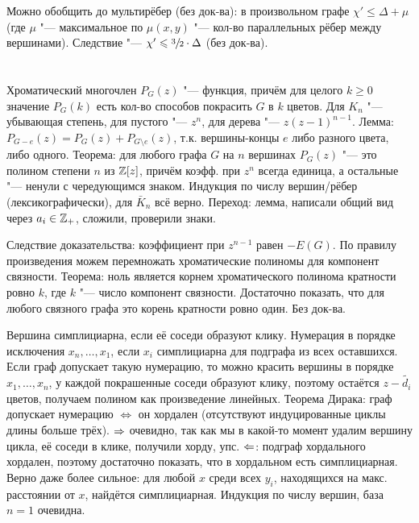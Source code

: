 	Можно обобщить до мультирёбер (без док-ва): в произвольном графе $\chi' \le \Delta + \mu$ (где $\mu$ "--- максимальное по $\mu(x, y)$ "--- кол-во параллельных рёбер между вершинами).
	Следствие "--- $\chi' \leqslant \sfrac 32 \cdot \Delta$ (без док-ва).

\section{} %
	Хроматический многочлен $P_G(z)$ "--- функция, причём для целого $k \ge 0$ значение $P_G(k)$ есть
	кол-во способов покрасить $G$ в $k$ цветов.
	Для $K_n$ "--- убывающая степень, для пустого "--- $z^n$, для дерева "--- $z(z-1)^{n-1}$.
	Лемма: $P_{G-e}(z) = P_G(z) + P_{G \setminus e}(z)$, т.к. вершины-концы $e$ либо разного цвета, либо одного.
	Теорема: для любого графа $G$ на $n$ вершинах $P_G(z)$ "--- это полином степени $n$ из $\mathbb{Z}[z]$,
	причём коэфф. при $z^n$ всегда единица, а остальные "--- ненули с чередующимся знаком.
	Индукция по числу вершин/рёбер (лексикографически), для $\bar K_n$ всё верно.
	Переход: лемма, написали общий вид через $a_i \in \mathbb{Z}_{+}$, сложили, проверили знаки.

	Следствие доказательства: коэффициент при $z^{n-1}$ равен $-E(G)$.
	По правилу произведения можем перемножать хроматические полиномы для компонент связности.
	Теорема: ноль является корнем хроматического полинома кратности ровно $k$, где $k$ "--- число компонент связности.
	Достаточно показать, что для любого связного графа это корень кратности ровно один.
	Без док-ва.

	Вершина симплициарна, если её соседи образуют клику.
	Нумерация в порядке исключения $x_n, \dots, x_1$, если $x_i$ симплициарна для подграфа из всех оставшихся.
	Если граф допускает такую нумерацию, то можно красить вершины в порядке $x_1, \dots, x_n$, у каждой покрашенные
	соседи образуют клику, поэтому остаётся $z - \tilde{d_i}$ цветов, получаем полином как произведение линейных.
	Теорема Дирака: граф допускает нумерацию $\iff$ он хордален (отсутствуют индуцированные циклы длины больше трёх).
	$\Rightarrow$ очевидно, так как мы в какой-то момент удалим вершину цикла, её соседи в клике, получили хорду, упс.
	$\Leftarrow$: подграф хордального хордален, поэтому достаточно показать, что в хордальном есть симплициарная.
	Верно даже более сильное: для любой $x$ среди всех $y_i$, находящихся на макс. расстоянии от $x$, найдётся симплициарная.
	Индукция по числу вершин, база $n=1$ очевидна.

